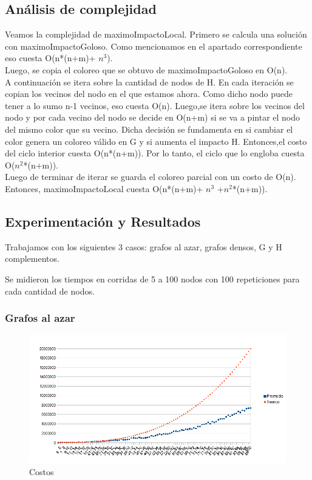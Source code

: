 \subsection{Análisis de complejidad}

\indent Veamos la complejidad de maximoImpactoLocal. Primero se calcula una solución con maximoImpactoGoloso. Como mencionamos en el apartado correspondiente eso cuesta O(n*(n+m)+ $n^{3}$). \\
\indent Luego, se copia el coloreo que se obtuvo de maximoImpactoGoloso en O(n).\\
\indent A continuación se itera sobre la cantidad de nodos de H. En cada iteración se copian los vecinos del nodo en el que estamos ahora. Como dicho nodo puede tener a lo sumo n-1 vecinos, eso cuesta O(n). Luego,se itera sobre los vecinos del nodo y por cada vecino del nodo se decide en O(n+m) si se va a pintar el nodo del mismo color que su vecino. Dicha decisión se fundamenta en si cambiar el color genera un coloreo válido en G y si aumenta el impacto H. Entonces,el costo del ciclo interior cuesta O(n*(n+m)). Por lo tanto, el ciclo que lo engloba cuesta O($n^{2}$*(n+m)).\\
\indent Luego de terminar de iterar se guarda el coloreo parcial con un costo de O(n).\\
\indent Entonces, maximoImpactoLocal cuesta O(n*(n+m)+ $n^{3}$ +$ n^{2}$*(n+m)).\\

\subsection{Experimentación y Resultados}
\quad Trabajamos con los siguientes 3 casos: grafos al azar, grafos densos, G y H complementos.

\quad Se midieron los tiempos en corridas de  5 a 100 nodos con 100 repeticiones para cada cantidad de nodos.

\subsubsection{Grafos al azar}

\begin{figure}[H]
	\centering
	\includegraphics[scale=0.8]{BLocal-tiempos-Azar.png}
\caption{Costos}
\end{figure}

